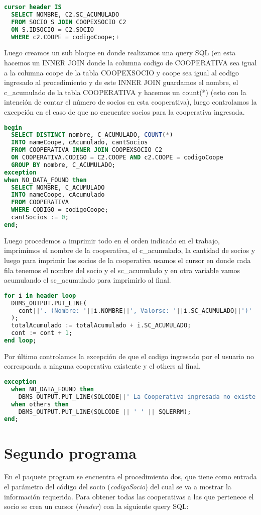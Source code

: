 \documentclass{article}
\begin{document}
\begin{lstlisting}[language=SQL]
cursor header IS
  SELECT NOMBRE, C2.SC_ACUMULADO
  FROM SOCIO S JOIN COOPEXSOCIO C2 
  ON S.IDSOCIO = C2.SOCIO
  WHERE c2.COOPE = codigoCoope;+\end{lstlisting}
  Luego creamos un sub bloque en donde realizamos una query SQL (en esta hacemos un INNER JOIN donde la columna codigo de COOPERATIVA sea igual a la columna coope de la tabla COOPEXSOCIO y coope sea igual al codigo ingresado al procedimiento y de este INNER JOIN guardamos el nombre, el c\_acumulado de la tabla COOPERATIVA y hacemos un count(*) (esto con la intención de contar el número de socios en esta cooperativa), luego controlamos la excepción en el caso de que no encuentre socios para la cooperativa ingresada.
\begin{lstlisting}[language=SQL]
begin
  SELECT DISTINCT nombre, C_ACUMULADO, COUNT(*)
  INTO nameCoope, cAcumulado, cantSocios
  FROM COOPERATIVA INNER JOIN COOPEXSOCIO C2 
  ON COOPERATIVA.CODIGO = C2.COOPE AND c2.COOPE = codigoCoope
  GROUP BY nombre, C_ACUMULADO;
exception
when NO_DATA_FOUND then
  SELECT NOMBRE, C_ACUMULADO
  INTO nameCoope, cAcumulado
  FROM COOPERATIVA
  WHERE CODIGO = codigoCoope;
  cantSocios := 0;
end;\end{lstlisting}
Luego procedemos a imprimir todo en el orden indicado en el trabajo, imprimimos el nombre de la cooperativa, el c\_acumulado, la cantidad de socios y luego para imprimir los socios de la cooperativa usamos el cursor en donde cada fila tenemos el nombre del socio y el sc\_acumulado y en otra variable vamos acumulando el sc\_acumulado para imprimirlo al final.
\begin{lstlisting}[language=SQL]
for i in header loop
  DBMS_OUTPUT.PUT_LINE(
    cont||'. (Nombre: '||i.NOMBRE||', Valorsc: '||i.SC_ACUMULADO||')'
  );
  totalAcumulado := totalAcumulado + i.SC_ACUMULADO;
  cont := cont + 1;
end loop;
\end{lstlisting}
Por último controlamos la excepción de que el codigo ingresado por el usuario no corresponda a ninguna cooperativa existente y el others al final.
\begin{lstlisting}[language=SQL]
exception
  when NO_DATA_FOUND then
    DBMS_OUTPUT.PUT_LINE(SQLCODE||' La Cooperativa ingresada no existe');
  when others then
    DBMS_OUTPUT.PUT_LINE(SQLCODE || ' ' || SQLERRM);
end;
\end{lstlisting}
\section{Segundo programa}
En el paquete program se encuentra el procedimiento dos, que tiene como entrada el parámetro del código del socio (\emph{codigoSocio}) del cual se va a mostrar la información requerida.
Para obtener todas las cooperativas a las que pertenece el socio se crea un cursor (\emph{header}) con la siguiente query SQL: 
\end{document}
